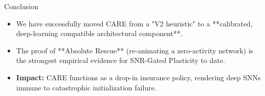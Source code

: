 \documentclass[aspectratio=169]{beamer}
\begin{document}
\begin{frame}{Conclusion}
    \begin{itemize}
        \item We have successfully moved CARE from a "V2 heuristic" to a **calibrated, deep-learning compatible architectural component**.
        \item The proof of **Absolute Rescue** (re-animating a zero-activity network) is the strongest empirical evidence for SNR-Gated Plasticity to date.
        \item \textbf{Impact:} CARE functions as a drop-in insurance policy, rendering deep SNNs immune to catastrophic initialization failure.
    \end{itemize}
\end{frame}
\end{document}
